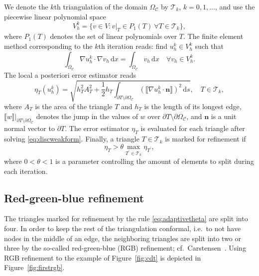 \documentclass[12pt]{rmstyle}
\begin{document}
We denote the \(k\)th triangulation of the
domain \(\Omega_{\mathcal{C}}\) by \(\mathcal{T}_k\), \(k=0,1,\dots\), and
use the piecewise linear polynomial space
$$V_h^k = \{ v \in V : v|_T \in P_1(T)~\forall T \in \mathcal{T}_k \},$$
where $P_1(T)$ denotes the set of linear polynomials over $T$.
The finite element method corresponding to the \(k\)th iteration reads:
find \(u_h^k \in V_h^k\) such that
\begin{equation}
   \label{eq:discweakform}
   \int_{\Omega_{\mathcal{C}}} \nabla u_h^k \cdot \nabla v_h \,\mathrm{d}x = \int_{\Omega_{\mathcal{C}}} v_h\,\mathrm{d}x \quad \forall v_h \in V_h^k.
\end{equation}
The local a posteriori error estimator
reads
\begin{equation}
        \eta_T(u_h^k) = \sqrt{h_T^2 A_T^2 + \frac12 h_T \int_{\partial T \setminus \partial \Omega_{\mathcal{C}}} (\llbracket \nabla u_h^k \cdot \boldsymbol{n} \rrbracket)^2 \,\mathrm{d}s}, \quad T \in \mathcal{T}_k,
\end{equation}
where $A_T$ is the area of the triangle $T$ and $h_T$ is the length of its longest edge, $\llbracket w \rrbracket |_{\partial T \setminus \partial \Omega_{\mathcal{C}}}$ denotes the jump in the values of
$w$ over $\partial T \setminus \partial \Omega_{\mathcal{C}}$, and $\boldsymbol{n}$ is a unit normal vector to
$\partial T$.
The error estimator $\eta_T$ is evaluated for each triangle
after solving \eqref{eq:discweakform}.
Finally, a triangle $T \in \mathcal{T}_k$ is marked for refinement if
\begin{equation}
  \label{eq:adaptivetheta}
   \eta_T > \theta \max_{T^\prime \in \mathcal{T}_k} \eta_{T^\prime},
\end{equation}
where $0 < \theta < 1$ is a parameter controlling the amount
of elements to split during each iteration. \cite{Verf_rth_2013}

\subsection{Red-green-blue refinement}
\label{sec:rgb}

The triangles marked for refinement by the rule \eqref{eq:adaptivetheta} are
split into four.  In order to keep the rest of the triangulation conformal,
i.e.~to not have nodes in the middle of an edge, the neighboring triangles
are split into two or three by the so-called red-green-blue (RGB) refinement;
cf.~Carstensen~\cite{carstensen2004adaptive}.  Using RGB refinement to the
example of Figure~\ref{fig:cdt} is depicted in Figure~\ref{fig:firstrgb}.
\end{document}
